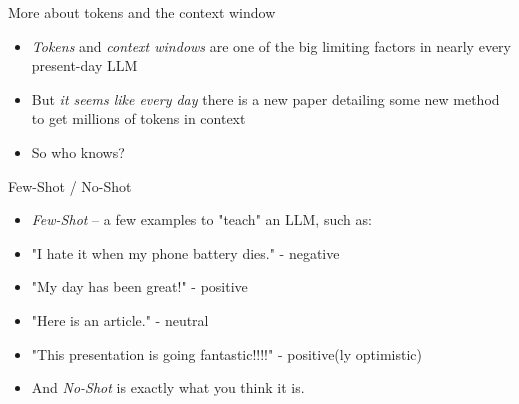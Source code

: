 \documentclass{beamer}
\begin{document}

\begin{frame}[plain]
\end{frame}

\begin{frame}{More about tokens and the context window}
	\begin{itemize}
		\item \textit{Tokens} and \textit{context windows} are one of the big limiting factors in nearly every present-day LLM
		\pause
		\item But \textit{it seems like every day} there is a new paper detailing some new method to get millions of tokens in context
		\pause
		\item So who knows?
	\end{itemize}
	
\end{frame}

\begin{frame}{Few-Shot / No-Shot}
	\begin{itemize}
		\item \textit{Few-Shot} -- a few examples to "teach" an LLM, such as:
		\pause
		\item "I hate it when my phone battery dies." - negative
		\pause
		\item "My day has been great!" - positive
		\pause
		\item "Here is an article." - neutral
		\pause
		\item "This presentation is going fantastic!!!!" - positive(ly optimistic)
		\pause
		\item And \textit{No-Shot} is exactly what you think it is.
	\end{itemize}
\end{frame}
\end{document}
